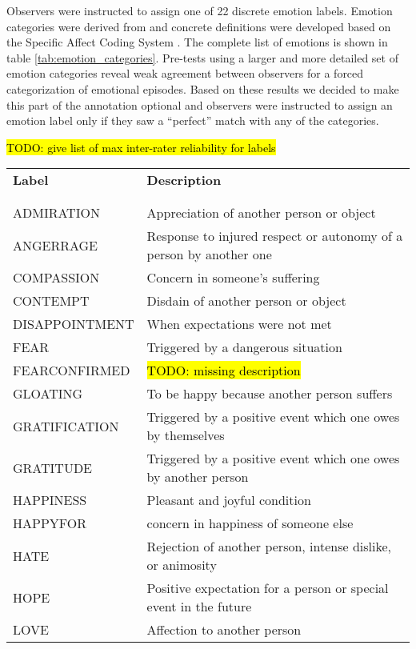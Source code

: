 Observers were instructed to assign one of 22 discrete emotion labels. Emotion
categories were derived from \cite{Ort1990} and concrete definitions were
developed based on the Specific Affect Coding System \cite{CG2007}. The
complete list of emotions is shown in table \ref{tab:emotion_categories}.
Pre-tests using a larger and more detailed set of emotion categories reveal
weak agreement between observers for a forced categorization of emotional
episodes. Based on these results we decided to make this part of the annotation
optional and observers were instructed to assign an emotion label only if they
saw a ``perfect'' match with any of the categories.

\hl{TODO: give list of max inter-rater reliability for labels}

\begin{table}
  \centering
  \begin{tabular}{lp{10cm}}
    \textbf{Label} & \textbf{Description} \\
    \\\hline\\
    ADMIRATION & Appreciation of another person or object \\
    ANGERRAGE & Response to injured respect or autonomy of a person by another one \\
    COMPASSION & Concern in someone's suffering \\
    CONTEMPT & Disdain of another person or object \\
    DISAPPOINTMENT & When expectations were not met \\
    FEAR & Triggered by a dangerous situation \\
    FEARCONFIRMED & \hl{TODO: missing description}\\
    GLOATING & To be happy because another person suffers \\
    GRATIFICATION & Triggered by a positive event which one owes by themselves  \\
    GRATITUDE & Triggered by a positive event which one owes by another person \\
    HAPPINESS & Pleasant and joyful condition \\
    HAPPYFOR & concern in happiness of someone else \\
    HATE & Rejection of another person, intense dislike, or animosity \\
    HOPE & Positive expectation for a person or special event in the future \\
    LOVE & Affection to another person \\

\end{tabular}
\end{table}
